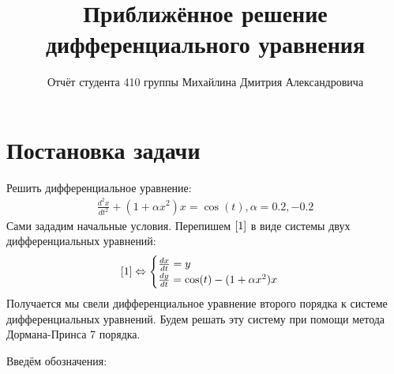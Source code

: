 \documentclass[12pt, a4paper] {report}
\theoremstyle{remark}
\theoremstyle{definition}
\begin{document}
\newcommand{\address}{{
\bigskip
\footnotesize
\textsc{Московский государственный университет им. М.В. Ломоносова,
механико-математический факультет, Москва}\par\nopagebreak
}}


\title{Приближённое решение дифференциального уравнения}

\author{Отчёт студента 410 группы Михайлина Дмитрия Александровича} %


\maketitle

\section{Постановка задачи}
Решить дифференциальное уравнение:
\begin{gather}
	\label{1} \frac{d^2x}{dt^2} + (1 + \alpha x^2)x = \cos(t), 	 \alpha = 0.2, -0.2
\end{gather}
Сами зададим начальные условия.
Перепишем $\ref{1}$ в виде системы двух дифференциальных уравнений:
\begin{gather}
 \ref{1} \Leftrightarrow 
 \begin{cases}
 \frac{dx}{dt} = y \\
 \frac{dy}{dt} = \cos(t) - (1 + \alpha x^2)x
 \end{cases}
\end{gather}
Получается мы свели дифференциальное уравнение второго порядка к системе дифференциальных уравнений.
Будем решать эту систему при помощи метода Дормана-Принса 7 порядка.

Введём обозначения:
\end{document}
